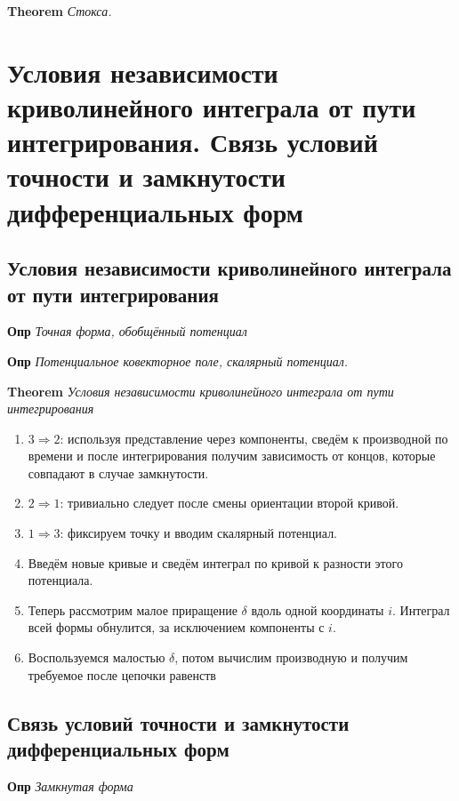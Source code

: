 \documentclass[a4paper, 14pt]{article}
\begin{document}
    \textbf{Theorem} \textit{Стокса. }
    
    \section{Условия независимости криволинейного интеграла от пути интегрирования.
    Связь условий точности и замкнутости дифференциальных форм}
    
    \subsection{Условия независимости криволинейного интеграла от пути интегрирования}
    
    \textbf{Опр} \textit{Точная форма, обобщённый потенциал}
    
    \textbf{Опр} \textit{Потенциальное ковекторное поле, скалярный потенциал.}
    
    \textbf{Theorem} \textit{Условия независимости криволинейного интеграла от пути интегрирования}
    
    \begin{enumerate}
        \item $3 \Rightarrow 2$: используя представление через компоненты, сведём к производной по времени и после
        интегрирования получим зависимость от концов, которые совпадают в случае замкнутости.
        \item $2 \Rightarrow 1$: тривиально следует после смены ориентации второй кривой.
        \item $1 \Rightarrow 3$: фиксируем точку и вводим скалярный потенциал.
        \item Введём новые кривые и сведём интеграл по кривой к разности этого потенциала.
        \item Теперь рассмотрим малое приращение $\delta$ вдоль одной координаты $i$.
        Интеграл всей формы обнулится, за исключением компоненты с $i$.
        \item Воспользуемся малостью $\delta$, потом вычислим производную и получим требуемое после цепочки равенств
    \end{enumerate}
    
    \subsection{Связь условий точности и замкнутости дифференциальных форм}
    
    \textbf{Опр} \textit{Замкнутая форма}
    
\end{document}

